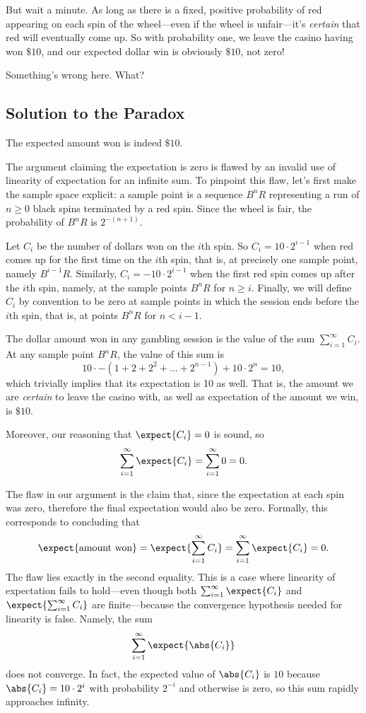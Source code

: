 \begin{editingnotes}
But wait a minute.  As long as there is a fixed, positive probability of
red appearing on each spin of the wheel---even if the wheel is
unfair---it's \emph{certain} that red will eventually come up.  So with
probability one, we leave the casino having won $\$10$, and our expected
dollar win is obviously $\$10$, not zero!

Something's wrong here.  What?

\subsection{Solution to the Paradox}

The expected amount won is indeed $\$10$.

The argument claiming the expectation is zero is flawed by an invalid use
of linearity of expectation for an infinite sum.  To pinpoint this flaw,
let's first make the sample space explicit: a sample point is a sequence
$B^nR$ representing a run of $n \geq 0$ black spins terminated by a red
spin.  Since the wheel is fair, the probability of $B^nR$ is $2^{-(n+1)}$.

Let $C_i$ be the number of dollars won on the $i$th spin.  So
$C_i = 10 \cdot 2^{i-1}$
when red comes up for the first time on the $i$th spin, that is, at
precisely one sample point, namely $B^{i-1}R$.  Similarly,
$C_i = -10  \cdot  2^{i-1}$
when the first red spin comes up after the $i$th spin, namely, at the
sample points $B^nR$ for $n \geq i$.  Finally, we will define $C_i$ by
convention to be zero at sample points in which the session ends before the
$i$th spin, that is, at points $B^nR$ for $n < i-1$.

The dollar amount won in any gambling session is the value of the sum
$\sum_{i = 1}^\infty C_i$.  At any sample point $B^nR$, the value of this
sum is
\[
10 \cdot -(1 + 2 + 2^2 + \dots + 2^{n - 1}) + 10 \cdot 2^n  = 10,
\]
which trivially implies that its expectation is 10 as well.  That is, the
amount we are \emph{certain} to leave the casino with, as well as
expectation of the amount we win, is $\$10$.

Moreover, our reasoning that $\expect{C_i} = 0$ is sound, so
\[
\sum_{i = 1}^\infty \expect{C_i} = \sum_{i = 1}^\infty 0 = 0.
\]

The flaw in our argument is the claim that, since the expectation at each
spin was zero, therefore the final expectation would also be zero.
Formally, this corresponds to concluding that
\[
\expect{\mbox{amount won}}  =  \expect{\sum_{i = 1}^\infty C_i}
  =  \sum_{i = 1}^\infty \expect{C_i} = 0.
\]
The flaw lies exactly in the second equality.  This is a case where
linearity of expectation fails to hold---even though both $\sum_{i =
1}^\infty \expect{C_i}$ and $\expect{\sum_{i = 1}^\infty C_i}$ are
finite---because the convergence hypothesis needed for linearity is false.
Namely, the sum
\[
\sum_{i = 1}^\infty \expect{\abs{C_i}}
\]
does not converge.  In fact, the expected value of $\abs{C_i}$ is $10$
because $\abs{C_i} =  10 \cdot 2^{i}$  with probability $2^{-i}$ and
otherwise is zero, so this sum rapidly approaches infinity.


\end{editingnotes}
